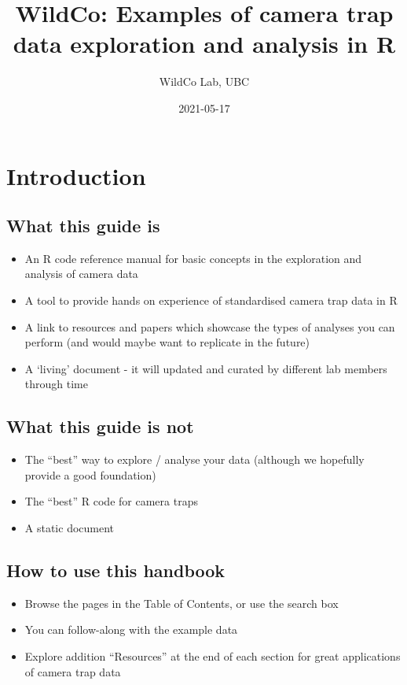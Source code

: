 \documentclass[]{book}
\title{WildCo: Examples of camera trap data exploration and analysis in R}
\author{WildCo Lab, UBC}
\date{2021-05-17}
\providecommand{\tightlist}{%
  \setlength{\itemsep}{0pt}\setlength{\parskip}{0pt}}
\begin{document}
\maketitle

{
\setcounter{tocdepth}{1}
\tableofcontents
}
\chapter{Introduction}\label{introduction}

\section{What this guide is}\label{what-this-guide-is}

\begin{itemize}
\tightlist
\item
  An R code reference manual for basic concepts in the exploration and
  analysis of camera data
\item
  A tool to provide hands on experience of standardised camera trap data
  in R
\item
  A link to resources and papers which showcase the types of analyses
  you can perform (and would maybe want to replicate in the future)
\item
  A `living' document - it will updated and curated by different lab
  members through time
\end{itemize}

\section{What this guide is not}\label{what-this-guide-is-not}

\begin{itemize}
\tightlist
\item
  The ``best'' way to explore / analyse your data (although we hopefully
  provide a good foundation)
\item
  The ``best'' R code for camera traps
\item
  A static document
\end{itemize}

\section{How to use this handbook}\label{how-to-use-this-handbook}

\begin{itemize}
\tightlist
\item
  Browse the pages in the Table of Contents, or use the search box
\item
  You can follow-along with the example data
\item
  Explore addition ``Resources'' at the end of each section for great
  applications of camera trap data
\end{itemize}
\end{document}
